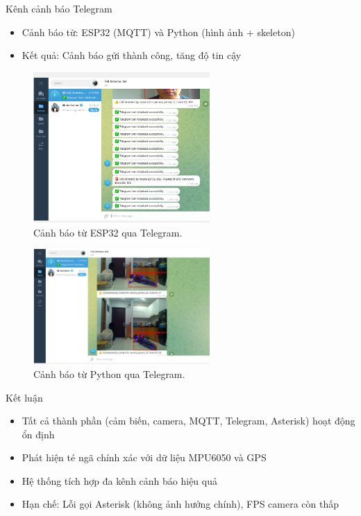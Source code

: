 \begin{frame}{Kênh cảnh báo Telegram}
    \begin{itemize}
        \item Cảnh báo từ: ESP32 (MQTT) và Python (hình ảnh + skeleton)
        \item Kết quả: Cảnh báo gửi thành công, tăng độ tin cậy
    \end{itemize}
    \begin{figure}
        \centering
        \includegraphics[width=0.6\textwidth]{images/telegram_fall_module1_send.png}
        \caption{Cảnh báo từ ESP32 qua Telegram.}
    \end{figure}
    \begin{figure}
        \centering
        \includegraphics[width=0.6\textwidth]{images/telegram_python_fall_send.png}
        \caption{Cảnh báo từ Python qua Telegram.}
    \end{figure}
\end{frame}

\begin{frame}{Kết luận}
    \begin{itemize}
        \item Tất cả thành phần (cảm biến, camera, MQTT, Telegram, Asterisk) hoạt động ổn định
        \item Phát hiện té ngã chính xác với dữ liệu MPU6050 và GPS
        \item Hệ thống tích hợp đa kênh cảnh báo hiệu quả
        \item Hạn chế: Lỗi gọi Asterisk (không ảnh hưởng chính), FPS camera còn thấp
    \end{itemize}
\end{frame}
